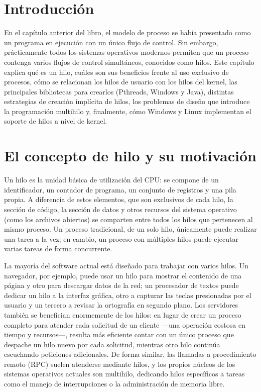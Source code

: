 \documentclass[12pt,letterpaper]{article}
\begin{document}

\section{Introducción}

En el capítulo anterior del libro, el modelo de proceso se había presentado como un programa en ejecución con un único flujo de control. Sin embargo, prácticamente todos los sistemas operativos modernos permiten que un proceso contenga varios flujos de control simultáneos, conocidos como hilos. Este capítulo explica qué es un hilo, cuáles son sus beneficios frente al uso exclusivo de procesos, cómo se relacionan los hilos de usuario con los hilos del kernel, las principales bibliotecas para crearlos (Pthreads, Windows y Java), distintas estrategias de creación implícita de hilos, los problemas de diseño que introduce la programación multihilo y, finalmente, cómo Windows y Linux implementan el soporte de hilos a nivel de kernel.

\section{El concepto de hilo y su motivación}

Un hilo es la unidad básica de utilización del CPU: se compone de un identificador, un contador de programa, un conjunto de registros y una pila propia. A diferencia de estos elementos, que son exclusivos de cada hilo, la sección de código, la sección de datos y otros recursos del sistema operativo (como los archivos abiertos) se comparten entre todos los hilos que pertenecen al mismo proceso. Un proceso tradicional, de un solo hilo, únicamente puede realizar una tarea a la vez; en cambio, un proceso con múltiples hilos puede ejecutar varias tareas de forma concurrente.

La mayoría del software actual está diseñado para trabajar con varios hilos. Un navegador, por ejemplo, puede usar un hilo para mostrar el contenido de una página y otro para descargar datos de la red; un procesador de textos puede dedicar un hilo a la interfaz gráfica, otro a capturar las teclas presionadas por el usuario y un tercero a revisar la ortografía en segundo plano. Los servidores también se benefician enormemente de los hilos: en lugar de crear un proceso completo para atender cada solicitud de un cliente —una operación costosa en tiempo y recursos—, resulta más eficiente contar con un único proceso que despache un hilo nuevo por cada solicitud, mientras otro hilo continúa escuchando peticiones adicionales. De forma similar, las llamadas a procedimiento remoto (RPC) suelen atenderse mediante hilos, y los propios núcleos de los sistemas operativos actuales son multihilo, dedicando hilos específicos a tareas como el manejo de interrupciones o la administración de memoria libre.
\end{document}
